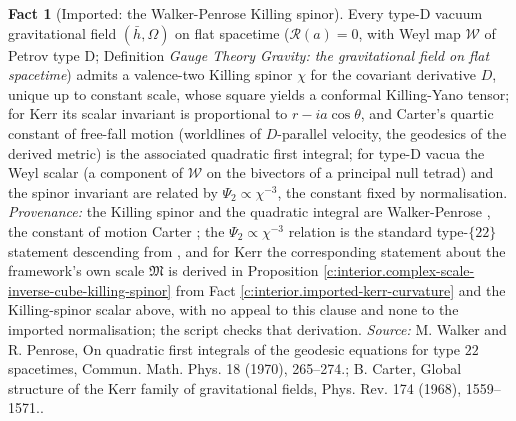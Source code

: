 \documentclass[11pt]{article}
\theoremstyle{definition}
\newtheorem{fact}[theorem]{Fact}
\theoremstyle{plain}
\newcommand{\changedmark}[2]{\marginpar{\raggedright\scriptsize\color{#1}#2}}
\providecommand{\hb}{}\renewcommand{\hb}{\bar{h}}
\begin{document}
\begin{fact}[Imported: the Walker-Penrose Killing spinor]\label{c:interior.imported-walker-penrose-killing-spinor}
\changedmark{gray}{reworded}
Every type-D vacuum gravitational field $(\hb, \Omega)$ on flat spacetime ($\mathcal{R}(a) = 0$, with Weyl map $\mathcal{W}$ of Petrov type D; Definition \emph{Gauge Theory Gravity: the gravitational field on flat spacetime}) admits a valence-two Killing spinor $\chi$ for the covariant derivative $D$, unique up to constant scale, whose square yields a conformal Killing-Yano tensor; for Kerr its scalar invariant is proportional to $r - ia\cos\theta$, and Carter's quartic constant of free-fall motion (worldlines of $D$-parallel velocity, the geodesics of the derived metric) is the associated quadratic first integral; for type-D vacua the Weyl scalar (a component of $\mathcal{W}$ on the bivectors of a principal null tetrad) and the spinor invariant are related by $\Psi_2 \propto \chi^{-3}$, the constant fixed by normalisation. \emph{Provenance:} the Killing spinor and the quadratic integral are Walker-Penrose \cite{WalkerPenrose1970}, the constant of motion Carter \cite{Carter1968}; the $\Psi_2 \propto \chi^{-3}$ relation is the standard type-$\{22\}$ statement descending from \cite{WalkerPenrose1970}, and for Kerr the corresponding statement about the framework's own scale $\mathfrak M$ is derived in Proposition \ref{c:interior.complex-scale-inverse-cube-killing-spinor} from Fact \ref{c:interior.imported-kerr-curvature} and the Killing-spinor scalar above, with no appeal to this clause and none to the imported normalisation; the script checks that derivation.
\emph{Source:} M. Walker and R. Penrose, On quadratic first integrals of the geodesic equations for type $22$ spacetimes, Commun. Math. Phys. 18 (1970), 265--274.; B. Carter, Global structure of the Kerr family of gravitational fields, Phys. Rev. 174 (1968), 1559--1571..
\end{fact}
\end{document}
